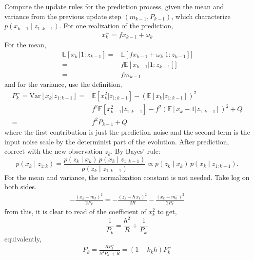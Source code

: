 \documentclass{article}
\begin{document}
Compute the update rules for the prediction process, given the mean and variance from the previous update step $(m_{k-1}, P_{k-1})$, which characterize $p(x_{k-1} \mid z_{1:k-1})$. For one realization of the prediction,
\begin{equation}
\begin{split}
x^-_{k}=f x_{k-1}+ \omega_k 
\end{split}
\end{equation}
For the mean,
\begin{equation}
\begin{split}
 \mathbb{E}[x^-_{k}|1:z_{k-1}]=& \mathbb{E}[f x_{k-1}+ \omega_k |1:z_{k-1}] ]\\
 =& f\mathbb{E}[ x_{k-1}|1:z_{k-1}] ] \\
 =& f m_{k-1}
 \end{split}
\end{equation}
and for the variance, use the definition,
\begin{equation}
\begin{split}
P_k^- =\text{Var}[x_k | z_{1:k-1}] =& \mathbb{E}[x_k^2| z_{1:k-1}] -  (\mathbb{E}[x_k| z_{1:k-1}])^2 \\
=& f^2 \mathbb{E}[x_{k-1}^2| z_{1:k-1}]- f^2(\mathbb{E}[x_k-1| z_{1:k-1}])^2 +Q \\
=& f^2 P_{k-1} +Q
\end{split}
\end{equation}
where the first contribution is just the prediction noise and the second term is the input noise scale by the determinist part of the evolution. After prediction, correct with the new observation $z_k$. By Bayes' rule:
\begin{equation}
  p(x_k \mid z_{1:k})
  = \frac{p(z_k \mid x_k)\, p(x_k \mid z_{1:k-1})}{p(z_k \mid z_{1:k-1})}
  \propto p(z_k \mid x_k)\, p(x_k \mid z_{1:k-1}).
\end{equation}
For the mean and variance, the normalization constant is not needed. Take log on both sides.
\begin{equation}
\begin{split}
-\frac{(x_k-m_k)^2}{2P_{k}}= -\frac{(z_k - h\,x_k)^2}{2R} - \frac{(x_k-m^-_k)^2}{2P_k^-} 
\end{split}
\end{equation}
from this, it is clear to read of the coefficient of $x_k^2$ to get,
\begin{equation}
\frac{1}{P_k}=\frac{h^2}{R} + \frac{1}{P^-_{k}}
\end{equation}
equivalently,
\begin{align}
P_k = \frac{R P_k^-}{h^2 P_k^- + R}=(1-k_kh)P^-_k 
\end{align}
\end{document}

